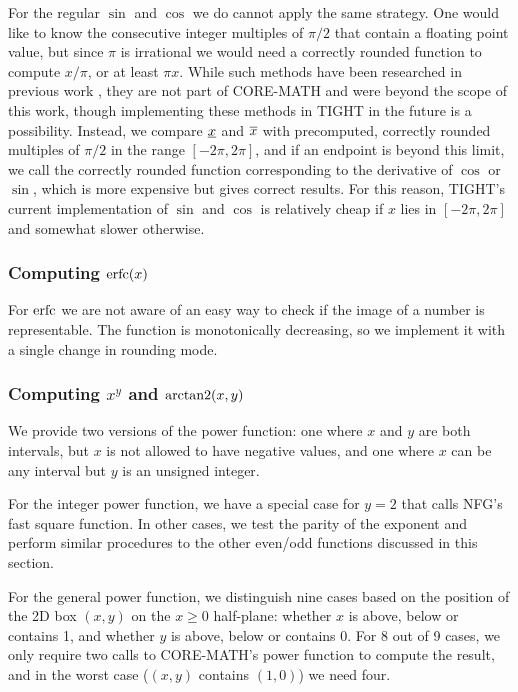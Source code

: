 For the regular $\sin$ and $\cos$ we do cannot apply the same strategy. One would like to know the consecutive integer multiples of $\pi/2$ that contain a floating point value, but since $\pi$ is irrational we would need a correctly rounded function to compute $x/\pi$, or at least $\pi x$. While such methods have been researched in previous work \cite{crpi}, they are not part of CORE-MATH and were beyond the scope of this work, though implementing these methods in TIGHT in the future is a possibility.
Instead, we compare $\underline{x}$ and $\overline{x}$ with precomputed, correctly rounded multiples of $\pi/2$ in the range $[-2\pi, 2\pi]$, and if an endpoint is beyond this limit, we call the correctly rounded function corresponding to the derivative of $\cos$ or $\sin$, which is more expensive but gives correct results.
For this reason, TIGHT's current implementation of $\sin$ and $\cos$ is relatively cheap if $x$ lies in $[-2\pi, 2\pi]$ and somewhat slower otherwise.

\subsubsection{Computing $\operatorname{erfc}(x)$}
For $\operatorname{erfc}$ we are not aware of an easy way to check if the image of a number is representable. The function is monotonically decreasing, so we implement it with a single change in rounding mode.

\subsubsection{Computing $x^y$ and $\operatorname{arctan2}(x,y)$}
We provide two versions of the power function: one where $x$ and $y$ are both intervals, but $x$ is not allowed to have negative values, and one where $x$ can be any interval but $y$ is an unsigned integer.

For the integer power function, we have a special case for $y=2$ that calls NFG's fast square function. In other cases, we test the parity of the exponent and perform similar procedures to the other even/odd functions discussed in this section.

For the general power function, we distinguish nine cases based on the position of the 2D box $(x,y)$ on the $x\geq0$ half-plane: whether $x$ is above, below or contains 1, and whether $y$ is above, below or contains 0.
For 8 out of 9 cases, we only require two calls to CORE-MATH's power function to compute the result, and in the worst case ($(x,y)$ contains $(1,0)$) we need four.

